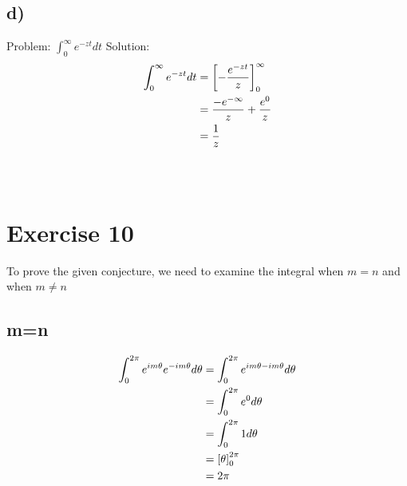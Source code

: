 \documentclass[notitlepage]{article}
\newcommand{\HwBreak}{%
  \par\noindent\makebox[\linewidth]{\rule{0.9\paperwidth}{0.4pt}}\par%
}
\begin{document}
\subsection*{d)}
    Problem: $\int_0^\infty{e^{-zt}dt}$
    Solution: \\
\begin{equation}
    \begin{aligned}
       \int_0^\infty{e^{-zt}dt}     &= \left[-\frac{e^{-zt}}{z}\right]_0^{\infty} \notag \\
                                    &= \frac{-e^{-\infty}}{z} + \frac{e^0}{z} \\
                                    &=\frac{1}{z}
    \end{aligned}
\end{equation} \\~\\


\HwBreak
\section*{Exercise 10}
    To prove the given conjecture, we need to examine the integral when $m=n$ and when $m \neq n$
\subsection*{m=n}
\begin{equation}
    \begin{aligned}
        \int_0^{2\pi}{e^{im\theta}e^{-im\theta}d\theta}     &=  \int_0^{2\pi}{e^{im\theta - im\theta}d\theta} \notag \\
                                                            &=  \int_0^{2\pi}{e^0d\theta} \\
                                                            &= \int_0^{2\pi}{1d\theta} \\
                                                            &= \left[\theta\right]_0^{2\pi} \\
                                                            &= 2\pi
    \end{aligned}
\end{equation} 
\end{document}
